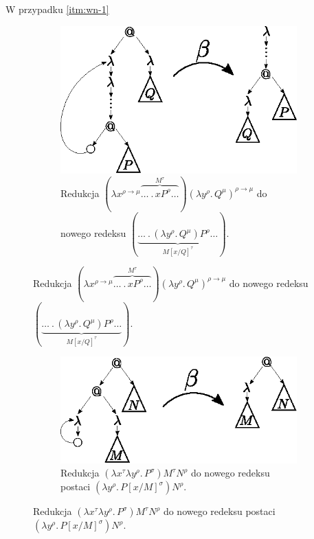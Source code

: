 \begin{dowod}
W przypadku \ref{itm:wn-1}
  \begin{figure}[htb]
  \centering
  \begin{subfigure}{0.55\textwidth}
    \includegraphics[width=1\linewidth]{../reduction1}
    \caption{Redukcja \((\lambda x^{\rho\to\mu}\overbrace{\dots\ .\,x P^\rho \dots}^{M^\tau})(\lambda y^\rho.\, Q^\mu)^{\rho\to\mu}\) do nowego redeksu \((\underbrace{\dots\ .\,(\lambda y^\rho.\,Q^\mu)P^\rho\dots}_{M[x/Q]^\tau})\).}
  \end{subfigure}


\end{figure}
\begin{figure}[htb]\ContinuedFloat
  \centering
  \vspace{1em}
  \begin{subfigure}{0.55\textwidth}
    \includegraphics[width=1\linewidth]{../reduction2}
    \caption{Redukcja \((\lambda x^\tau \lambda y^\rho.\,P^\sigma)M^\tau N^\rho\) do nowego redeksu postaci \((\lambda y^\rho .\, P[x/M]^\sigma)N^\rho\).}
  \end{subfigure}



\end{figure}
\end{dowod}
